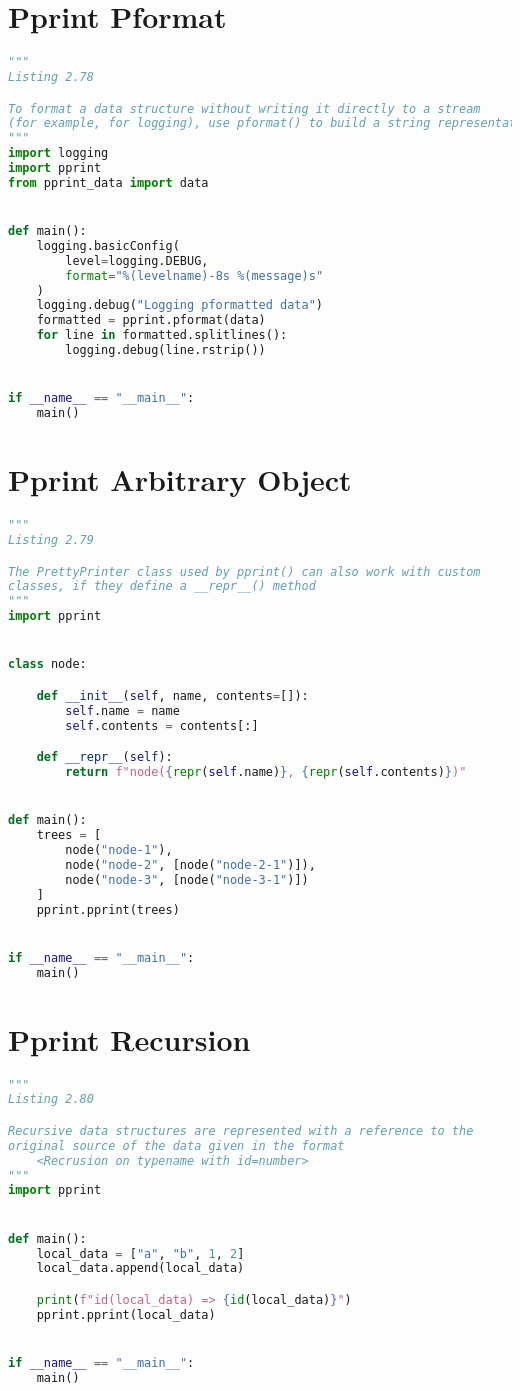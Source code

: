 \documentclass[a4paper,landscape]{report}
\begin{document}
\section{Pprint Pformat}
\begin{lstlisting}[language=Python]
"""
Listing 2.78

To format a data structure without writing it directly to a stream
(for example, for logging), use pformat() to build a string representation
"""
import logging
import pprint
from pprint_data import data


def main():
    logging.basicConfig(
        level=logging.DEBUG,
        format="%(levelname)-8s %(message)s"
    )
    logging.debug("Logging pformatted data")
    formatted = pprint.pformat(data)
    for line in formatted.splitlines():
        logging.debug(line.rstrip())


if __name__ == "__main__":
    main()

\end{lstlisting}
\section{Pprint Arbitrary Object}
\begin{lstlisting}[language=Python]
"""
Listing 2.79

The PrettyPrinter class used by pprint() can also work with custom
classes, if they define a __repr__() method
"""
import pprint


class node:

    def __init__(self, name, contents=[]):
        self.name = name
        self.contents = contents[:]

    def __repr__(self):
        return f"node({repr(self.name)}, {repr(self.contents)})"


def main():
    trees = [
        node("node-1"),
        node("node-2", [node("node-2-1")]),
        node("node-3", [node("node-3-1")])
    ]
    pprint.pprint(trees)


if __name__ == "__main__":
    main()

\end{lstlisting}
\section{Pprint Recursion}
\begin{lstlisting}[language=Python]
"""
Listing 2.80

Recursive data structures are represented with a reference to the
original source of the data given in the format
    <Recrusion on typename with id=number>
"""
import pprint


def main():
    local_data = ["a", "b", 1, 2]
    local_data.append(local_data)

    print(f"id(local_data) => {id(local_data)}")
    pprint.pprint(local_data)


if __name__ == "__main__":
    main()

\end{lstlisting}
\end{document}
